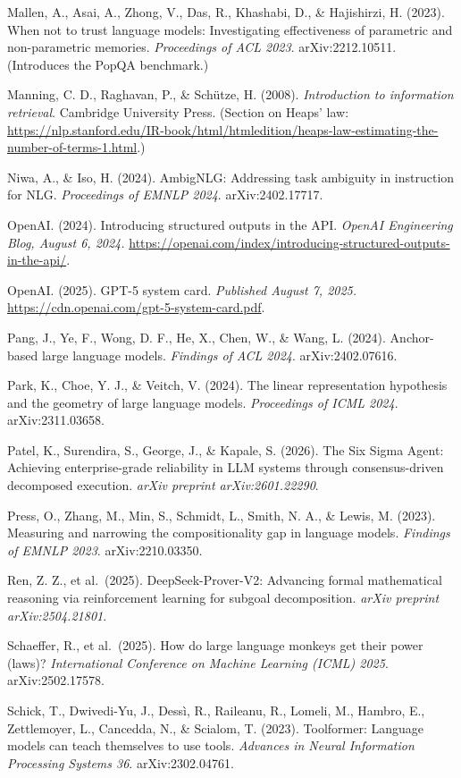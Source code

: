 \documentclass[
]{article}
\begin{document}
Mallen, A., Asai, A., Zhong, V., Das, R., Khashabi, D., \& Hajishirzi,
H. (2023). When not to trust language models: Investigating
effectiveness of parametric and non-parametric memories.
\emph{Proceedings of ACL 2023}. arXiv:2212.10511. (Introduces the PopQA
benchmark.)

Manning, C. D., Raghavan, P., \& Schütze, H. (2008). \emph{Introduction
to information retrieval}. Cambridge University Press. (Section on
Heaps' law:
\url{https://nlp.stanford.edu/IR-book/html/htmledition/heaps-law-estimating-the-number-of-terms-1.html}.)

Niwa, A., \& Iso, H. (2024). AmbigNLG: Addressing task ambiguity in
instruction for NLG. \emph{Proceedings of EMNLP 2024}. arXiv:2402.17717.

OpenAI. (2024). Introducing structured outputs in the API. \emph{OpenAI
Engineering Blog, August 6, 2024.}
\url{https://openai.com/index/introducing-structured-outputs-in-the-api/}.

OpenAI. (2025). GPT-5 system card. \emph{Published August 7, 2025.}
\url{https://cdn.openai.com/gpt-5-system-card.pdf}.

Pang, J., Ye, F., Wong, D. F., He, X., Chen, W., \& Wang, L. (2024).
Anchor-based large language models. \emph{Findings of ACL 2024}.
arXiv:2402.07616.

Park, K., Choe, Y. J., \& Veitch, V. (2024). The linear representation
hypothesis and the geometry of large language models. \emph{Proceedings
of ICML 2024}. arXiv:2311.03658.

Patel, K., Surendira, S., George, J., \& Kapale, S. (2026). The Six
Sigma Agent: Achieving enterprise-grade reliability in LLM systems
through consensus-driven decomposed execution. \emph{arXiv preprint
arXiv:2601.22290}.

Press, O., Zhang, M., Min, S., Schmidt, L., Smith, N. A., \& Lewis, M.
(2023). Measuring and narrowing the compositionality gap in language
models. \emph{Findings of EMNLP 2023}. arXiv:2210.03350.

Ren, Z. Z., et al.~(2025). DeepSeek-Prover-V2: Advancing formal
mathematical reasoning via reinforcement learning for subgoal
decomposition. \emph{arXiv preprint arXiv:2504.21801}.

Schaeffer, R., et al.~(2025). How do large language monkeys get their
power (laws)? \emph{International Conference on Machine Learning (ICML)
2025}. arXiv:2502.17578.

Schick, T., Dwivedi-Yu, J., Dessì, R., Raileanu, R., Lomeli, M., Hambro,
E., Zettlemoyer, L., Cancedda, N., \& Scialom, T. (2023). Toolformer:
Language models can teach themselves to use tools. \emph{Advances in
Neural Information Processing Systems 36}. arXiv:2302.04761.
\end{document}

